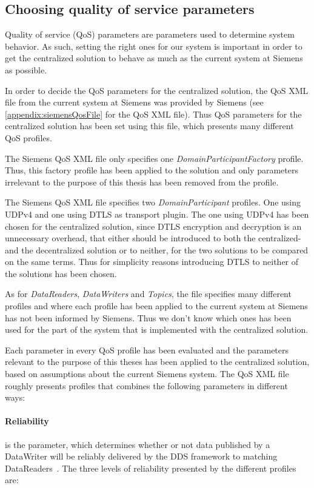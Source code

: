 \subsection{Choosing quality of service parameters}\label{sec:choosingQosParams}

Quality of service (QoS) parameters are parameters used to determine system behavior. As such, setting the right ones for our system is important in order to get the centralized solution to behave as much as the current system at Siemens as possible. 

In order to decide the QoS parameters for the centralized solution, the QoS XML file from the current system at Siemens was provided by Siemens (see \cref{appendix:siemensQosFile} for the QoS XML file). Thus QoS parameters for the centralized solution has been set using this file, which presents many different QoS profiles.

The Siemens QoS XML file only specifies one \textit{DomainParticipantFactory} profile. Thus, this factory profile has been applied to the solution and only parameters irrelevant to the purpose of this thesis has been removed from the profile. 

The Siemens QoS XML file specifies two \textit{DomainParticipant} profiles. One using UDPv4 and one using DTLS as transport plugin. The one using UDPv4 has been chosen for the centralized solution, since DTLS encryption and decryption is an unnecessary overhead, that either should be introduced to both the centralized- and the decentralized solution or to neither, for the two solutions to be compared on the same terms. Thus for simplicity reasons introducing DTLS to neither of the solutions has been chosen.

As for \textit{DataReaders}, \textit{DataWriters} and \textit{Topics}, the file specifies many different profiles and where each profile has been applied to the current system at Siemens has not been informed by Siemens. Thus we don't know which ones has been used for the part of the system that is implemented with the centralized solution. 

Each parameter in every QoS profile has been evaluated and the parameters relevant to the purpose of this theses has been applied to the centralized solution, based on assumptions about the current Siemens system. The QoS XML file roughly presents profiles that combines the following parameters in different ways:

\paragraph{Reliability} is the parameter, which determines whether or not data published by a DataWriter will be reliably delivered by the DDS framework to matching DataReaders~\cite{rtiConnextUsersManual}. The three levels of reliability presented by the different profiles are:

